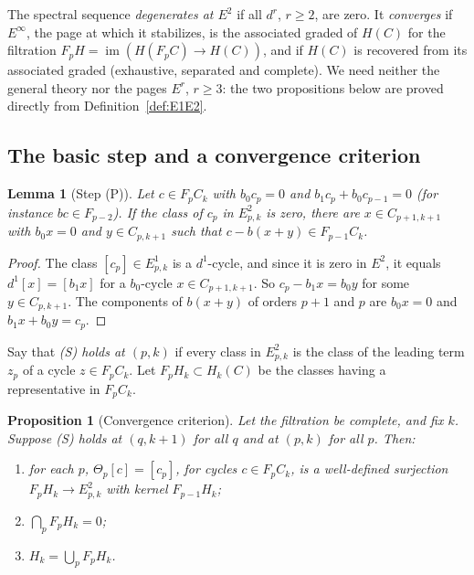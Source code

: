 \documentclass[11pt,oneside,reqno]{article}
\DeclareMathOperator{\Ran}{im}
\theoremstyle{plain}
\newtheorem{proposition}[theorem]{Proposition}
\newtheorem{lemma}[theorem]{Lemma}
\theoremstyle{definition}
\theoremstyle{remark}
\begin{document}
The spectral sequence \emph{degenerates at \(E^2\)} if all \(d^r\), \(r\ge2\), are
zero. It \emph{converges} if \(E^\infty\), the page at which it stabilizes, is
the associated graded of \(H(C)\) for the filtration
\(F_pH=\Ran(H(F_pC)\to H(C))\), and if \(H(C)\) is recovered from its
associated graded (exhaustive, separated and complete). We need neither
the general theory nor the pages \(E^r\), \(r\ge3\): the two propositions
below are proved directly from Definition~\ref{def:E1E2}.

\subsection{The basic step and a convergence criterion}\label{subsec:criterion}

\begin{lemma}[Step (P)]\label{lem:stepP}
Let \(c\in F_pC_k\) with \(b_0c_p=0\) and \(b_1c_p+b_0c_{p-1}=0\) (for instance
\(bc\in F_{p-2}\)). If the class of \(c_p\) in \(E^2_{p,k}\) is zero, there are
\(x\in C_{p+1,k+1}\) with \(b_0x=0\) and \(y\in C_{p,k+1}\) such that
\(c-b(x+y)\in F_{p-1}C_k\).
\end{lemma}

\begin{proof}
The class \([c_p]\in E^1_{p,k}\) is a \(d^1\)-cycle, and since it is zero in
\(E^2\), it equals \(d^1[x]=[b_1x]\) for a \(b_0\)-cycle \(x\in C_{p+1,k+1}\). So
\(c_p-b_1x=b_0y\) for some \(y\in C_{p,k+1}\). The components of \(b(x+y)\) of
orders \(p+1\) and \(p\) are \(b_0x=0\) and \(b_1x+b_0y=c_p\).
\end{proof}

Say that \emph{(S) holds at \((p,k)\)} if every class in \(E^2_{p,k}\) is the
class of the leading term \(z_p\) of a cycle \(z\in F_pC_k\). Let
\(F_pH_k\subset H_k(C)\) be the classes having a representative in \(F_pC_k\).

\begin{proposition}[Convergence criterion]\label{prop:criterion}
Let the filtration be complete, and fix \(k\). Suppose (S) holds at
\((q,k+1)\) for all \(q\) and at \((p,k)\) for all \(p\). Then:
\begin{enumerate}
\item for each \(p\), \(\Theta_p[c]=[c_p]\), for cycles \(c\in F_pC_k\), is a
well-defined surjection \(F_pH_k\to E^2_{p,k}\) with kernel \(F_{p-1}H_k\);
\item \(\bigcap_pF_pH_k=0\);
\item \(H_k=\bigcup_pF_pH_k\).
\end{enumerate}
\end{proposition}
\end{document}

